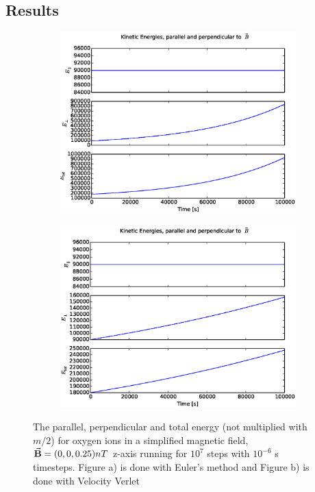 \documentclass[x11names]{article}
\begin{document}
\subsection{Results}
    
    \begin{figure} 
      \begin{subfigure}{0.45\textwidth}
        \includegraphics[width = \textwidth]{../source/figures/energyEuler_simple8-3}
      \end{subfigure}
      \begin{subfigure}{0.45\textwidth}
        \includegraphics[width = \textwidth]{../source/figures/energyVerlet_simple8-3}
      \end{subfigure}
      \caption{The parallel, perpendicular and total energy (not multiplied with \(m/2\)) for oxygen ions in a simplified magnetic field, \(\va{B} = (0,0,0.25) nT \) z-axis running for \(10^7\) steps with \(10^{-6}\) s timesteps. Figure a) is done with Euler's method and Figure b) is done with Velocity Verlet}
      \label{fig:energy_simpleB}
    \end{figure}
\end{document}
